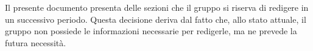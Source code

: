 Il presente documento presenta delle sezioni che il gruppo \gruppo \space si riserva di redigere in un successivo periodo. Questa decisione deriva dal fatto che, allo stato attuale, il gruppo \gruppo \space non possiede le informazioni necessarie per redigerle, ma ne prevede la futura necessità.